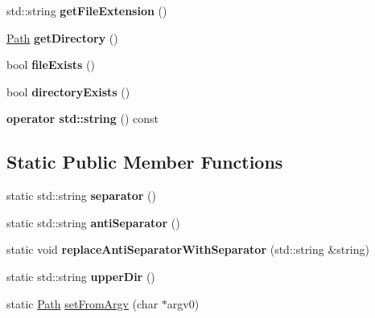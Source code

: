 \begin{DoxyCompactItemize}
\item 
\mbox{\label{classraisim_1_1Path_ad3c39888c9605a3494f1a8a3f0ccdd71}} 
std\+::string {\bfseries get\+File\+Extension} ()
\item 
\mbox{\label{classraisim_1_1Path_a5058358f14f5755f664ab24f3fc9da6d}} 
\hyperlink{classraisim_1_1Path}{Path} {\bfseries get\+Directory} ()
\item 
\mbox{\label{classraisim_1_1Path_a32d6b2fc47c3d0e8f2860b66a520541d}} 
bool {\bfseries file\+Exists} ()
\item 
\mbox{\label{classraisim_1_1Path_a48fa8a5d205c2a05959af76e818cbcde}} 
bool {\bfseries directory\+Exists} ()
\item 
\mbox{\label{classraisim_1_1Path_a81ca24cfe29acd95dbaee564edd7cb9b}} 
{\bfseries operator std\+::string} () const
\end{DoxyCompactItemize}
\subsection*{Static Public Member Functions}
\begin{DoxyCompactItemize}
\item 
\mbox{\label{classraisim_1_1Path_a60ea00b3d27df126aa7be2b26335fdb6}} 
static std\+::string {\bfseries separator} ()
\item 
\mbox{\label{classraisim_1_1Path_a0a87e9c546017b8b514ca4df0702f19a}} 
static std\+::string {\bfseries anti\+Separator} ()
\item 
\mbox{\label{classraisim_1_1Path_a0226473d859538e494c9d074c304898b}} 
static void {\bfseries replace\+Anti\+Separator\+With\+Separator} (std\+::string \&string)
\item 
\mbox{\label{classraisim_1_1Path_a0cdfe31e1b6be79cedbd3e5212ec83d5}} 
static std\+::string {\bfseries upper\+Dir} ()
\item 
static \hyperlink{classraisim_1_1Path}{Path} \hyperlink{classraisim_1_1Path_a0e4dade2e046891b1737b16c36af74b7}{set\+From\+Argv} (char $\ast$argv0)
\end{DoxyCompactItemize}


